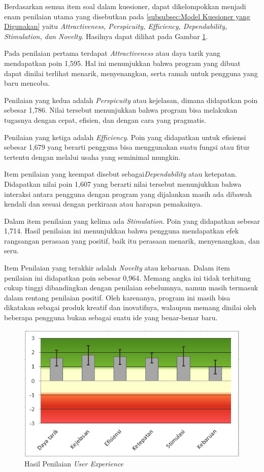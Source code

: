 Berdasarkan semua item soal dalam kuesioner, dapat dikelompokkan menjadi enam penilaian utama yang disebutkan pada \ref{subsubsec:Model Kuesioner yang Digunakan} yaitu \emph{Attractiveness, Perspicuity, Efficiency, Dependability, Stimulation, dan Novelty}. Hasilnya dapat dilihat pada Gambar \ref{fig:Hasil Penilaian User Experience}. 

Pada penilaian pertama terdapat \emph{Attractiveness} atau daya tarik yang mendapatkan poin 1,595. Hal ini menunjukkan bahwa program yang dibuat dapat dinilai terlihat menarik, menyenangkan, serta ramah untuk pengguna yang baru mencoba.

Penilaian yang kedua adalah \emph{Perspicuity} atau kejelasan, dimana didapatkan poin sebesar 1,786. Nilai tersebut menunjukkan bahwa program bisa melakukan tugasnya dengan cepat, efisien, dan dengan cara yang pragmatis.

Penilaian yang ketiga adalah \emph{Efficiency}. Poin yang didapatkan untuk efisiensi sebesar 1,679 yang berarti pengguna bisa menggunakan suatu fungsi atau fitur tertentu dengan melalui usaha yang seminimal mungkin.

Item penilaian yang keempat disebut sebagai\emph{Dependability} atau ketepatan. Didapatkan nilai poin 1,607 yang berarti nilai tersebut menunjukkan bahwa interaksi antara pengguna dengan program yang dijalankan masih ada dibawah kendali dan sesuai dengan perkiraan atau harapan pemakainya.
  
Dalam item penilaian yang kelima ada \emph{Stimulation}. Poin yang didapatkan sebesar 1,714. Hasil penilaian ini menunjukkan bahwa pengguna mendapatkan efek rangsangan perasaan yang positif, baik itu perasaan menarik, menyenangkan, dan seru.

Item Penilaian yang terakhir adalah \emph{Novelty} atau kebaruan. Dalam item penilaian ini didapatkan poin sebesar 0,964. Memang angka ini tidak terhitung cukup tinggi dibandingkan dengan penilaian sebelumnya, namun masih termasuk dalam rentang penilaian positif. Oleh karenanya, program ini masih bisa dikatakan sebagai produk kreatif dan inovatifnya, walaupun memang dinilai oleh beberapa pengguna bukan sebagai suatu ide yang benar-benar baru.

\begin{figure}[!htb]
  \centering
  \includegraphics[scale=1.1]{gambar/pengujian-user-experience/hasil-tiap-penilaian.png}
  \caption{Hasil Penilaian \emph{User Experience}}
  \label{fig:Hasil Penilaian User Experience}
\end{figure}

